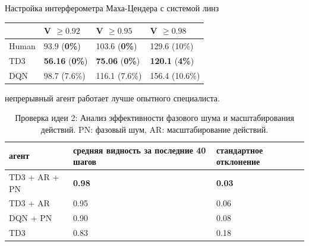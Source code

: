\begin{frame}[allowframebreaks]{Настройка интерферометра Маха-Цендера с системой линз}
\vspace{-10pt}
\begin{table} [htbp]
    \centering
    \begin{threeparttable}
        \begin{tabular}{| p{2cm} || p{2cm} || p{2cm} || p{3cm} |}
            \hline
            \hline
            &V $\ge 0.92$ & V $\ge 0.95$ & V $\ge 0.98$ \\
            \hline
            Human &  93.9 (\textbf{0\%})  & 103.6 (\textbf{0\%}) & 129.6 (10\%)\\
            TD3 &  \textbf{56.16} (\textbf{0\%}) & \textbf{75.06} (\textbf{0\%}) & \textbf{120.1} (\textbf{4\%})\\
            DQN &  98.7 (7.6\%) & 116.1 (7.6\%) & 156.4 (10.6\%)\\
            \hline
            \hline
        \end{tabular}
    \end{threeparttable}
\end{table}

 непрерывный агент работает лучше опытного специалиста.

\framebreak

\begin{table} [htbp]
    \centering
    \begin{threeparttable}
        \caption*{{\color{orange}Проверка идеи 2:} Анализ эффективности фазового шума и масштабирования действий. PN: фазовый шум, AR: масштабирование действий.}
        \begin{tabular}{| p{3cm} || p{3cm} || p{3cm} |}
            \hline
            \hline
            агент & средняя видность за последние 40 шагов & стандартное отклонение \\
            \hline
            TD3 + AR + PN & \textbf{0.98} & \textbf{0.03} \\
            TD3 + AR & 0.95 & 0.06\\
            DQN + PN & 0.90 & 0.08\\
            TD3& 0.83 & 0.18\\
            \hline
            \hline
        \end{tabular}
    \end{threeparttable}
\end{table}

\end{frame}

